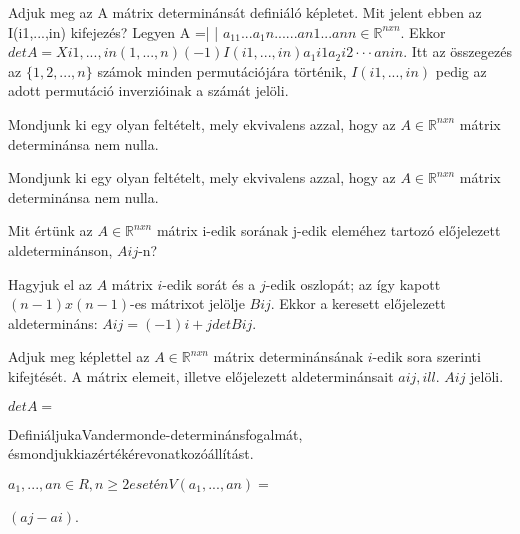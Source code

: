 \begin{frame}
  \begin{tcolorbox}[title={23}]
   Adjuk meg az A mátrix determinánsát definiáló képletet. Mit jelent ebben az I(i1,...,in) kifejezés? 
  \tcblower
Legyen A =| |
$a_11 ... a_1n . . . . . . an1 ... ann \in \mathbb{R}^{n x n}$. Ekkor $detA = X i1,...,in (1,...,n)
(-1)I(i1,...,in)a_1i1a_2i2  \cdot  \cdot  \cdot anin$.
Itt az összegezés az $\{1,2,...,n\}$ számok minden permutációjára történik, $I(i1,...,in)$ pedig az adott permutáció inverzióinak a számát jelöli.

  \end{tcolorbox}
\end{frame}


\begin{frame}
  \begin{tcolorbox}[title={24}]
   Mondjunk ki egy olyan feltételt, mely ekvivalens azzal, hogy az $A \in \mathbb{R}^{n x n}$ mátrix determinánsa nem nulla.

  \tcblower
Mondjunk ki egy olyan feltételt, mely ekvivalens azzal, hogy az $A \in \mathbb{R}^{n x n}$ mátrix determinánsa nem nulla.

  \end{tcolorbox}
\end{frame}


\begin{frame}
  \begin{tcolorbox}[title={25}]
   Mit értünk az $A \in \mathbb{R}^{n x n}$ mátrix i-edik sorának j-edik eleméhez tartozó előjelezett aldeterminánson, $Aij$-n?

  \tcblower
Hagyjuk el az $A$ mátrix $i$-edik sorát és a $j$-edik oszlopát; az így kapott $(n-1)x(n-1)$-es mátrixot jelölje $Bij$. Ekkor a keresett előjelezett aldetermináns: $Aij = (-1)i+j detBij$.

  \end{tcolorbox}
\end{frame}

\begin{frame}
  \begin{tcolorbox}[title={26}]
   Adjuk meg képlettel az $A \in \mathbb{R}^{n x n}$ mátrix determinánsának $i$-edik sora szerinti kifejtését. A mátrix elemeit, illetve előjelezett aldeterminánsait $aij, ill$. $Aij$ jelöli.

  \tcblower
$detA =$
  \end{tcolorbox}
\end{frame}


\begin{frame}
  \begin{tcolorbox}[title={28}]
    DefiniáljukaVandermonde-determinánsfogalmát, ésmondjukkiazértékérevonatkozóállítást.

  \tcblower
$a_1,...,an \in R, n \geq 2 esetén V (a_1,...,an) =$



$(aj - ai)$.

  \end{tcolorbox}
\end{frame}


